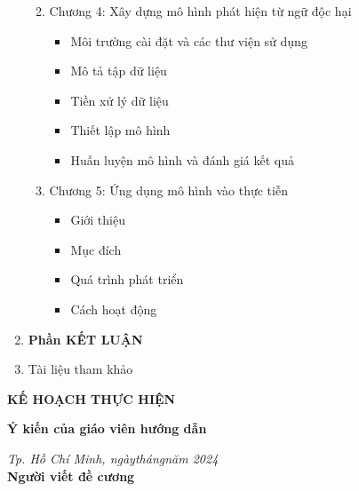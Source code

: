 \begin{enumerate}[label=\textbf{\arabic*.}]
\begin{enumerate}
\begin{itemize}
                    \end{itemize}
              \item Chương 4: Xây dựng mô hình phát hiện từ ngữ độc hại
                    \begin{itemize}
                        \item Môi trường cài đặt và các thư viện sử dụng
                        \item Mô tả tập dữ liệu
                        \item Tiền xử lý dữ liệu
                        \item Thiết lập mô hình
                        \item Huấn luyện mô hình và đánh giá kết quả
                    \end{itemize}
                \item Chương 5: Ứng dụng mô hình vào thực tiễn
                    \begin{itemize}
                        \item Giới thiệu
                        \item Mục đích
                        \item Quá trình phát triển
                        \item Cách hoạt động
                    \end{itemize}
          \end{enumerate}
    \item \textbf{Phần KẾT LUẬN}
    \item Tài liệu tham khảo
          \begin{enumerate}[label={[\arabic*]}]
              \item \dots
              \item \dots
          \end{enumerate}
\end{enumerate}

\textbf{KẾ HOẠCH THỰC HIỆN}


\noindent\begin{minipage}[t]{0.42\textwidth}
    \centering
    \fontsize{11pt}{16.5pt}
    \textbf{Ý kiến của giáo viên hướng dẫn}\\
\end{minipage}
\begin{minipage}[t]{0.57\textwidth}
    \centering
    \fontsize{11pt}{16.5pt}
    \textit{Tp. Hồ Chí Minh, ngày\qquad tháng\qquad năm 2024}\\
    \textbf{Người viết đề cương}\\
\end{minipage}
\restoregeometry